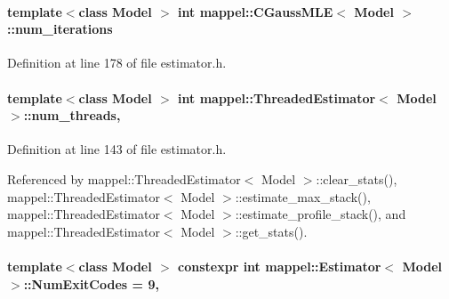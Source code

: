 \paragraph[{\texorpdfstring{num\+\_\+iterations}{num_iterations}}]{\setlength{\rightskip}{0pt plus 5cm}template$<$class Model $>$ int {\bf mappel\+::\+C\+Gauss\+M\+LE}$<$ Model $>$\+::num\+\_\+iterations}\hypertarget{classmappel_1_1CGaussMLE_a459a28314464b8cd80ff2e4d08dbbeb6}{}\label{classmappel_1_1CGaussMLE_a459a28314464b8cd80ff2e4d08dbbeb6}


Definition at line 178 of file estimator.\+h.

\paragraph[{\texorpdfstring{num\+\_\+threads}{num_threads}}]{\setlength{\rightskip}{0pt plus 5cm}template$<$class Model $>$ int {\bf mappel\+::\+Threaded\+Estimator}$<$ Model $>$\+::num\+\_\+threads\hspace{0.3cm}{\ttfamily [protected]}, {\ttfamily [inherited]}}\hypertarget{classmappel_1_1ThreadedEstimator_a6afa05d7d971f3317ce1602de853123b}{}\label{classmappel_1_1ThreadedEstimator_a6afa05d7d971f3317ce1602de853123b}


Definition at line 143 of file estimator.\+h.



Referenced by mappel\+::\+Threaded\+Estimator$<$ Model $>$\+::clear\+\_\+stats(), mappel\+::\+Threaded\+Estimator$<$ Model $>$\+::estimate\+\_\+max\+\_\+stack(), mappel\+::\+Threaded\+Estimator$<$ Model $>$\+::estimate\+\_\+profile\+\_\+stack(), and mappel\+::\+Threaded\+Estimator$<$ Model $>$\+::get\+\_\+stats().

\paragraph[{\texorpdfstring{Num\+Exit\+Codes}{NumExitCodes}}]{\setlength{\rightskip}{0pt plus 5cm}template$<$class Model $>$ constexpr int {\bf mappel\+::\+Estimator}$<$ Model $>$\+::Num\+Exit\+Codes = 9\hspace{0.3cm}{\ttfamily [static]}, {\ttfamily [inherited]}}\hypertarget{classmappel_1_1Estimator_afcec036c4d78c12d427e0a733a00a48e}{}\label{classmappel_1_1Estimator_afcec036c4d78c12d427e0a733a00a48e}



